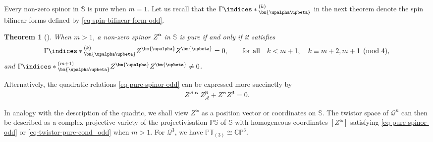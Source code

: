 \documentclass[10pt,a4paper]{amsart}
\numberwithin{equation}{section}
\newtheorem{Theorem}{Theorem}[section]
\newcommand{\mc} [1]{\mathcal{#1}}
\newcommand{\ind} {\indices}
\newcommand{\PT} {\mathbb{PT}}
\newcommand{\Ss} {\mathbb{S}}
\newcommand{\Pp} {\mathbb{P}}
\newcommand{\CP} {\mathbb{CP}}
\begin{document}
Every non-zero spinor in $\Ss$ is pure when $m=1$. Let us recall that the $\Gamma \ind*{^{(k)}_{\bm{\upalpha \upbeta}}}$ in the next theorem denote the spin bilinear forms def\/ined by \eqref{eq-spin-bilinear-form-odd}.
\begin{Theorem}[\cite{Cartan1981}]
When $m>1$, a non-zero spinor $Z^{\bm{\upalpha}}$ in $\Ss$ is pure if and only if it satisfies
\begin{gather}\label{eq-pure-spinor-odd}
\Gamma \ind*{^{(k)}_{\bm{\upalpha \upbeta}}} Z^{\bm{\upalpha}} Z^{\bm{\upbeta}} = 0 , \qquad \text{for all} \quad k < m+1 , \quad k \equiv m+2,m+1 \pmod{4},
\end{gather}
and $\Gamma \ind*{^{(m+1)}_{\bm{\upalpha \upbeta}}} Z^{\bm{\upalpha}} Z^{\bm{\upbeta}} \neq 0$.
\end{Theorem}
Alternatively, the quadratic relations \eqref{eq-pure-spinor-odd} can be expressed more succinctly by~\cite{Taghavi-Chabert2013}
\begin{gather}\label{eq-twistor-pure-cond_odd}
 Z^{\mc{A} \bm{\upalpha}} Z_\mc{A}^{\bm{\upbeta}} + Z^{\bm{\upalpha}} Z^{\bm{\upbeta}} = 0 .
\end{gather}

In analogy with the description of the quadric, we shall view $Z^{\bm{\upalpha}}$ as a position vector or coordinates on $\Ss$. The twistor space of $\mc{Q}^n$ can then be described as a complex projective variety of the projectivisation $\Pp \Ss$ of $\Ss$ with homogeneous coordinates $[Z^{\bm{\upalpha}}]$ satisfying \eqref{eq-pure-spinor-odd} or \eqref{eq-twistor-pure-cond_odd} when $m>1$. For $\mc{Q}^3$, we have $\PT_{(3)} \cong \CP^3$.
\end{document}

